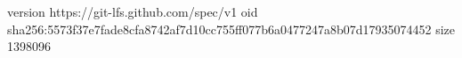 version https://git-lfs.github.com/spec/v1
oid sha256:5573f37e7fade8cfa8742af7d10cc755ff077b6a0477247a8b07d17935074452
size 1398096
